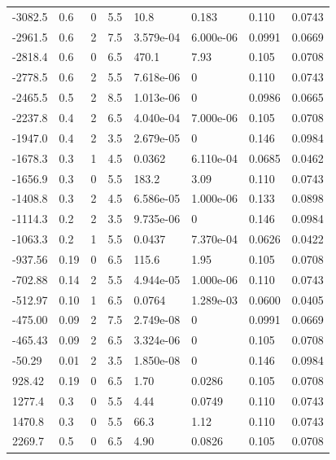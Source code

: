 \documentclass[preview]{standalone}
\begin{document}
{{\begin{tabular}{L{1.2cm}C{1.2cm} C{0.3cm}C{0.5cm} C{1.4cm}C{1.4cm} C{1.4cm}C{1.4cm}}
  -3082.5  &   0.6  & 0     & 5.5 &  10.8  & 0.183  & 0.110 &  0.0743   \\ 
  -2961.5  &   0.6  & 2     & 7.5 &  3.579e-04  & 6.000e-06  & 0.0991 &  0.0669   \\ 
  -2818.4  &   0.6  & 0     & 6.5 &  470.1  & 7.93  & 0.105 &  0.0708   \\ 
  -2778.5  &   0.6  & 2     & 5.5 &  7.618e-06  & 0  & 0.110 &  0.0743   \\ 
  -2465.5  &   0.5  & 2     & 8.5 &  1.013e-06  & 0  & 0.0986 &  0.0665   \\ 
  -2237.8  &   0.4  & 2     & 6.5 &  4.040e-04  & 7.000e-06  & 0.105 &  0.0708   \\ 
  -1947.0  &   0.4  & 2     & 3.5 &  2.679e-05  & 0  & 0.146 &  0.0984   \\ 
  -1678.3  &   0.3  & 1     & 4.5 &  0.0362  & 6.110e-04  & 0.0685 &  0.0462   \\ 
  -1656.9  &   0.3  & 0     & 5.5 &  183.2  & 3.09  & 0.110 &  0.0743   \\ 
  -1408.8  &   0.3  & 2     & 4.5 &  6.586e-05  & 1.000e-06  & 0.133 &  0.0898   \\ 
  -1114.3  &   0.2  & 2     & 3.5 &  9.735e-06  & 0  & 0.146 &  0.0984   \\ 
  -1063.3  &   0.2  & 1     & 5.5 &  0.0437  & 7.370e-04  & 0.0626 &  0.0422   \\ 
  -937.56  &  0.19  & 0     & 6.5 &  115.6  & 1.95  & 0.105 &  0.0708   \\ 
  -702.88  &  0.14  & 2     & 5.5 &  4.944e-05  & 1.000e-06  & 0.110 &  0.0743   \\ 
  -512.97  &  0.10  & 1     & 6.5 &  0.0764  & 1.289e-03  & 0.0600 &  0.0405   \\ 
  -475.00  &  0.09  & 2     & 7.5 &  2.749e-08  & 0  & 0.0991 &  0.0669   \\ 
  -465.43  &  0.09  & 2     & 6.5 &  3.324e-06  & 0  & 0.105 &  0.0708   \\ 
  -50.29  &  0.01  & 2     & 3.5 &  1.850e-08  & 0  & 0.146 &  0.0984   \\ 
  928.42  &  0.19  & 0     & 6.5 &  1.70  & 0.0286  & 0.105 &  0.0708   \\ 
  1277.4  &   0.3  & 0     & 5.5 &  4.44  & 0.0749  & 0.110 &  0.0743   \\ 
  1470.8  &   0.3  & 0     & 5.5 &  66.3  & 1.12  & 0.110 &  0.0743   \\ 
  2269.7  &   0.5  & 0     & 6.5 &  4.90  & 0.0826  & 0.105 &  0.0708   \\ 

\end{tabular}}}
\end{document}
